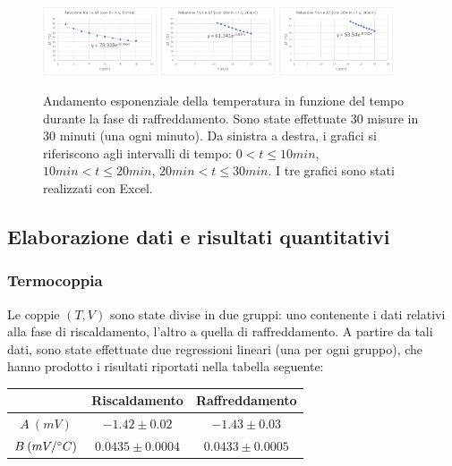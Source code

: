 \documentclass{article}
\begin{document}
\begin{figure}[h!] %
\centering
\includegraphics[width=0.3\textwidth]{n1}
\includegraphics[width=0.3\textwidth]{n2}
\includegraphics[width=0.3\textwidth]{n3}
\caption{Andamento esponenziale della temperatura in funzione del tempo durante la fase di raffreddamento. Sono state effettuate 30 misure in 30 minuti (una ogni minuto). Da sinistra a destra, i grafici si riferiscono agli intervalli di tempo: $0 < t \leqslant 10min$, $10min < t \leqslant 20min$, $20min < t \leqslant 30min$. I tre grafici sono stati realizzati con Excel.}
\label{grafici_newton}
\end{figure}

\subsection{Elaborazione dati e risultati quantitativi}
\subsubsection{Termocoppia}
Le coppie $(T,V)$ sono state divise in due gruppi: uno contenente i dati relativi alla fase di riscaldamento, l'altro a quella di raffreddamento. A partire da tali dati, sono state effettuate due regressioni lineari (una per ogni gruppo),  che hanno prodotto i risultati riportati nella tabella seguente:

\begin{center}
\begin{tabular}{|c|c|c|}
\hline
 & Riscaldamento & Raffreddamento \\
\hline
$ A \medspace (mV) $ & $ -1.42 \pm 0.02 $ & $ -1.43 \pm 0.03 $ \\
\hline
$ B \medspace (mV/\degree C) $ & $ 0.0435 \pm 0.0004 $ & $ 0.0433 \pm 0.0005 $ \\
\hline
\end{tabular}
\end{center}
\end{document}
